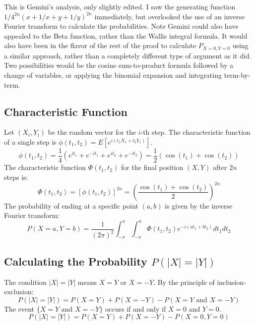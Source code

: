 \documentclass{article}
\begin{document}
This is Gemini's analysis, only slightly edited. I saw the generating function $1/4^{2n} (x+1/x+y+1/y)^{2n}$ immediately, but overlooked the use of an inverse Fourier transform to calculate the probabilities. Note Gemini could also have appealed to the Beta function, rather than the Wallis integral formula. It would also have been in the flavor of the rest of the proof to calculate $P_{X=0,Y=0}$ using a similar approach, rather than a completely different type of argument as it did. Two possibilities would be the cosine sum-to-product formula followed by a change of variables, or applying the binomial expansion and integrating term-by-term.

\subsection{Characteristic Function}

Let $(X_i, Y_i)$ be the random vector for the $i$-th step. The characteristic function of a single step is $\phi(t_1, t_2) = E[e^{i(t_1 X_1 + t_2 Y_1)}]$.
\[
\phi(t_1, t_2) = \frac{1}{4} (e^{it_1} + e^{-it_1} + e^{it_2} + e^{-it_2}) = \frac{1}{2} (\cos(t_1) + \cos(t_2))
\]
The characteristic function $\Phi(t_1, t_2)$ for the final position $(X, Y)$ after $2n$ steps is:
\[
\Phi(t_1, t_2) = [\phi(t_1, t_2)]^{2n} = \left( \frac{\cos(t_1) + \cos(t_2)}{2} \right)^{2n}
\]
The probability of ending at a specific point $(a, b)$ is given by the inverse Fourier transform:
\[
P(X=a, Y=b) = \frac{1}{(2\pi)^2} \int_{-\pi}^{\pi} \int_{-\pi}^{\pi} \Phi(t_1, t_2) e^{-i(at_1 + bt_2)} dt_1 dt_2
\]

\subsection{Calculating the Probability $P(|X|=|Y|)$}

The condition $|X|=|Y|$ means $X=Y$ or $X=-Y$. By the principle of inclusion-exclusion:
\[
P(|X|=|Y|) = P(X=Y) + P(X=-Y) - P(X=Y \text{ and } X=-Y)
\]
The event $\{X=Y \text{ and } X=-Y\}$ occurs if and only if $X=0$ and $Y=0$.
\[
P(|X|=|Y|) = P(X=Y) + P(X=-Y) - P(X=0, Y=0)
\]
\end{document}
